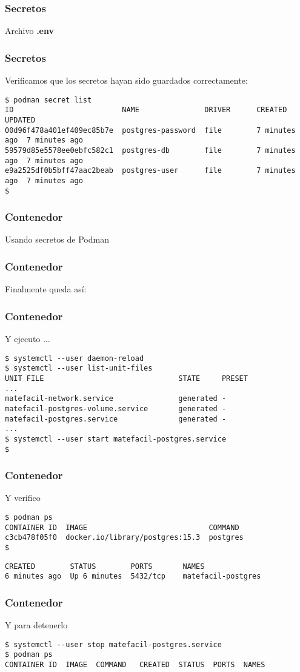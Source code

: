 \begin{frame}[fragile]
  \frametitle{Secretos}
  Archivo \textbf{.env}
  
\end{frame}

\begin{frame}[fragile]
  \frametitle{Secretos}
  Verificamos que los secretos hayan sido guardados correctamente:
  \begin{lstlisting}[basicstyle=\tiny]
$ podman secret list
ID                         NAME               DRIVER      CREATED        UPDATED
00d96f478a401ef409ec85b7e  postgres-password  file        7 minutes ago  7 minutes ago
59579d85e5578ee0ebfc582c1  postgres-db        file        7 minutes ago  7 minutes ago
e9a2525df0b5bff47aac2beab  postgres-user      file        7 minutes ago  7 minutes ago
$
  \end{lstlisting}
\end{frame}

\begin{frame}[fragile]
  \frametitle{Contenedor}
  Usando secretos de Podman
  
\end{frame}

\begin{frame}[fragile]
  \frametitle{Contenedor}
  Finalmente queda así:
  
\end{frame}

\begin{frame}[fragile]
  \frametitle{Contenedor}
  Y ejecuto ...
  \begin{lstlisting}
$ systemctl --user daemon-reload
$ systemctl --user list-unit-files
UNIT FILE                               STATE     PRESET
...
matefacil-network.service               generated -
matefacil-postgres-volume.service       generated -
matefacil-postgres.service              generated -
...
$ systemctl --user start matefacil-postgres.service
$
  \end{lstlisting}
\end{frame}

\begin{frame}[fragile]
  \frametitle{Contenedor}
  Y verifico
  \begin{lstlisting}
$ podman ps
CONTAINER ID  IMAGE                            COMMAND 
c3cb478f05f0  docker.io/library/postgres:15.3  postgres
$
  \end{lstlisting}
  \begin{lstlisting}
CREATED        STATUS        PORTS       NAMES
6 minutes ago  Up 6 minutes  5432/tcp    matefacil-postgres
  \end{lstlisting}
\end{frame}

\begin{frame}[fragile]
  \frametitle{Contenedor}
  Y para detenerlo
  \begin{lstlisting}
$ systemctl --user stop matefacil-postgres.service
$ podman ps
CONTAINER ID  IMAGE  COMMAND   CREATED  STATUS  PORTS  NAMES
  \end{lstlisting}
\end{frame}

